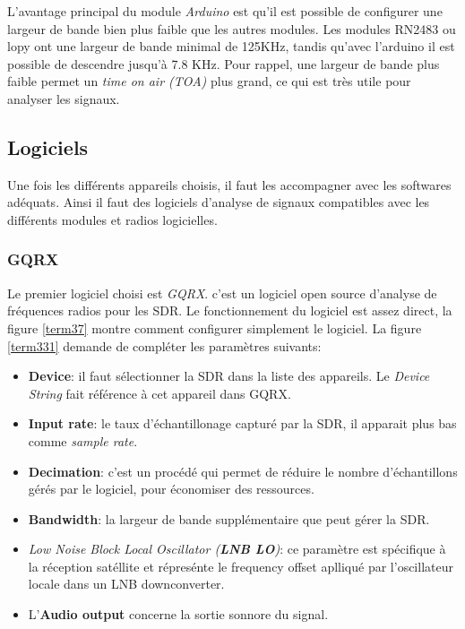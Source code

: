 L'avantage principal du module \textit{Arduino} est qu'il est possible de configurer une largeur de bande bien plus faible que les autres modules. Les modules RN2483 ou lopy ont une largeur de bande minimal de 125KHz, tandis qu'avec l'arduino il est possible de descendre jusqu'à 7.8 KHz. Pour rappel, une largeur de bande plus faible permet un \textit{time on air (TOA)} plus grand, ce qui est très utile pour analyser les signaux. 

\subsection{Logiciels}\label{fft}

Une fois les différents appareils choisis, il faut les accompagner avec les softwares adéquats. Ainsi il faut des logiciels d'analyse de signaux compatibles avec les différents modules et radios logicielles.

\subsubsection{GQRX}

Le premier logiciel choisi est \textit{GQRX}. c'est un logiciel open source d'analyse de fréquences radios pour les SDR. Le fonctionnement du logiciel est assez direct, la figure \ref{term37} montre comment configurer simplement le logiciel. La figure \ref{term331} demande de compléter les paramètres suivants:

\vspace{0.1cm}

\begin{itemize}
\item \textbf{Device}: il faut sélectionner la SDR dans la liste des appareils. Le \textit{Device String} fait référence à cet appareil dans GQRX.
\item \textbf{Input rate}: le taux d'échantillonage capturé par la SDR, il apparait plus bas comme \textit{sample rate}.
\item \textbf{Decimation}: c'est un procédé qui permet de réduire le nombre d'échantillons gérés par le logiciel, pour économiser des ressources.
\item \textbf{Bandwidth}: la largeur de bande supplémentaire que peut gérer la SDR.
\item \textit{Low Noise Block Local Oscillator (\textbf{LNB LO})}: ce paramètre est spécifique à la réception satéllite et répresénte le frequency offset aplliqué par l'oscillateur locale dans un LNB downconverter.
\item L'\textbf{Audio output} concerne la sortie sonnore du signal.
\end{itemize}

